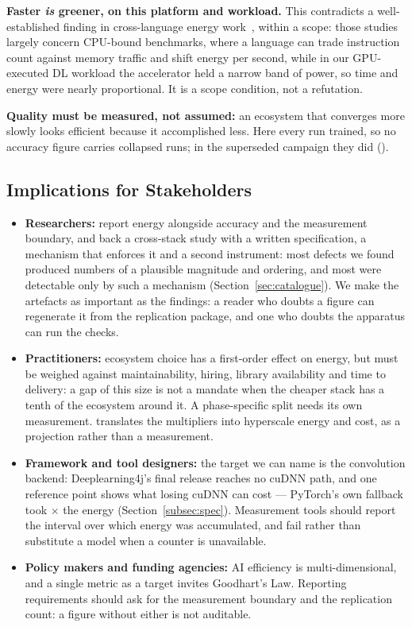 \textbf{Faster \emph{is} greener, on this platform and workload.} This
contradicts a well-established finding in cross-language energy
work~\citep{weber2023twins,rua2024large,pereira2021ranking}, within a scope:
those studies largely concern CPU-bound benchmarks, where a language can trade
instruction count against memory traffic and shift energy per second, while in
our GPU-executed DL workload the accelerator held a narrow band of power, so time
and energy were nearly proportional. It is a scope condition, not a refutation.

\textbf{Quality must be measured, not assumed:} an ecosystem that converges
more slowly looks efficient because it accomplished less. Here every run
trained, so no accuracy figure carries collapsed runs; in the superseded
campaign they did ().

\subsection{Implications for Stakeholders}

\begin{itemize}
 \item \textbf{Researchers:} report energy alongside accuracy and the
 measurement boundary, and back a cross-stack study with a written
 specification, a mechanism that enforces it and a second instrument: most
 defects we found produced numbers of a plausible magnitude and ordering, and
 most were detectable only by such a mechanism (Section~\ref{sec:catalogue}). We
 make the artefacts as important as the findings: a reader who doubts a figure
 can regenerate it from the replication package, and one who doubts the
 apparatus can run the checks.

 \item \textbf{Practitioners:} ecosystem choice has a first-order effect on
 energy, but must be weighed against maintainability, hiring, library
 availability and time to delivery: a gap of this size is not a mandate when the
 cheaper stack has a tenth of the ecosystem around it. A phase-specific split
 needs its own measurement.  translates the multipliers
 into hyperscale energy and cost, as a projection rather than a measurement.

 \item \textbf{Framework and tool designers:} the target we can name is the
 convolution backend: Deeplearning4j's final release reaches no cuDNN path,
 and one reference point shows what losing cuDNN can cost --- PyTorch's own
 fallback took \vCudnnOffEnergyRatio$\times$ the energy
 (Section~\ref{subsec:spec}). Measurement tools should report the interval over
 which energy was accumulated, and fail rather than substitute a model when a
 counter is unavailable.

 \item \textbf{Policy makers and funding agencies:} AI efficiency is
 multi-dimensional, and a single metric as a target invites Goodhart's Law.
 Reporting requirements should ask for the measurement boundary and the
 replication count: a figure without either is not auditable.
\end{itemize}

